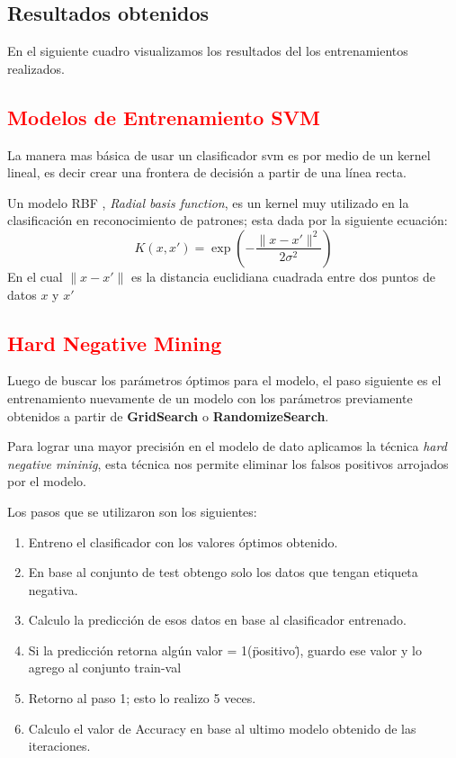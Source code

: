 \subsection{Resultados obtenidos}\label{sub:resultados}

En el siguiente cuadro visualizamos los resultados del  los entrenamientos realizados. 



\textcolor{red}{\subsection{Modelos de Entrenamiento SVM}\label{sub:linealModel}}

La manera mas básica de usar un clasificador \ac{svm} es por medio de un kernel lineal, es decir crear una frontera de decisión a partir de una línea 
recta. 

Un modelo RBF , \textit{Radial basis function}, es un kernel muy utilizado en la clasificación en reconocimiento de patrones; esta dada por la siguiente ecuación:
\begin{equation}
K(x,x')=\exp(-\frac{ \|x-x'\|^2}{2\sigma^2} )
\end{equation}\label{ec: ecuacionrbf}
En el cual \(\|x-x'\|\) es la distancia euclidiana cuadrada entre dos puntos de datos \(x\) y \(x'\)



\textcolor{red}{\subsection{Hard Negative Mining}\label{sub:hardnegativemining}}

Luego de buscar los parámetros óptimos para el modelo, el paso siguiente es el entrenamiento nuevamente de un modelo con los parámetros previamente obtenidos a partir de \textbf{GridSearch} o \textbf{RandomizeSearch}.

Para lograr una mayor precisión en el modelo de dato aplicamos la técnica \textit{hard negative mininig}, esta técnica nos permite eliminar los falsos positivos arrojados por el modelo.

Los pasos que se utilizaron son los siguientes:
\begin{enumerate}
	\item Entreno el clasificador con los valores óptimos obtenido.
	\item En base al conjunto de test obtengo solo los datos que tengan etiqueta negativa.
	\item Calculo la predicción de esos datos en base al clasificador entrenado.
	\item Si la predicción retorna algún valor = 1(\"positivo\"), guardo ese valor y lo agrego al conjunto train-val
	\item Retorno al paso 1; esto lo realizo 5 veces.
	\item Calculo el valor de Accuracy en base al ultimo modelo obtenido de las iteraciones.
\end{enumerate}

